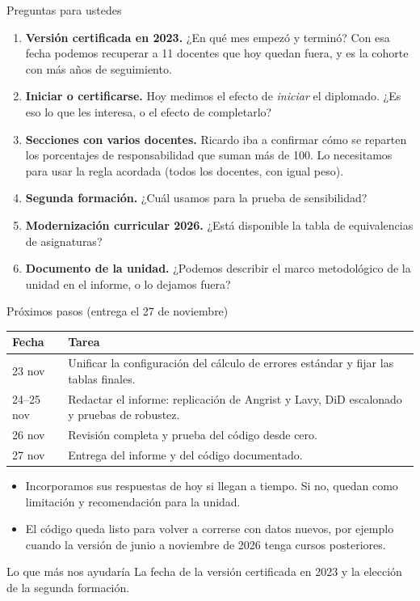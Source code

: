 \documentclass[10pt,aspectratio=169]{beamer}
\begin{document}
\begin{frame}{Preguntas para ustedes}
  \small
  \begin{enumerate}
    \item \textbf{Versión certificada en 2023.} ¿En qué mes empezó y terminó? Con esa fecha podemos recuperar a 11 docentes que hoy quedan fuera, y es la cohorte con más años de seguimiento.
    \item \textbf{Iniciar o certificarse.} Hoy medimos el efecto de \emph{iniciar} el diplomado. ¿Es eso lo que les interesa, o el efecto de completarlo?
    \item \textbf{Secciones con varios docentes.} Ricardo iba a confirmar cómo se reparten los porcentajes de responsabilidad que suman más de 100. Lo necesitamos para usar la regla acordada (todos los docentes, con igual peso).
    \item \textbf{Segunda formación.} ¿Cuál usamos para la prueba de sensibilidad?
    \item \textbf{Modernización curricular 2026.} ¿Está disponible la tabla de equivalencias de asignaturas?
    \item \textbf{Documento de la unidad.} ¿Podemos describir el marco metodológico de la unidad en el informe, o lo dejamos fuera?
  \end{enumerate}
\end{frame}

\begin{frame}{Próximos pasos (entrega el 27 de noviembre)}
  \begin{table}\small
    \begin{tabular}{lp{10.5cm}}
      \toprule
      Fecha & Tarea \\
      \midrule
      23 nov & Unificar la configuración del cálculo de errores estándar y fijar las tablas finales. \\
      24--25 nov & Redactar el informe: replicación de Angrist y Lavy, DiD escalonado y pruebas de robustez. \\
      26 nov & Revisión completa y prueba del código desde cero. \\
      27 nov & Entrega del informe y del código documentado. \\
      \bottomrule
    \end{tabular}
  \end{table}
  \vspace{0.4em}
  \begin{itemize}
    \item Incorporamos sus respuestas de hoy si llegan a tiempo. Si no, quedan como limitación y recomendación para la unidad.
    \item El código queda listo para volver a correrse con datos nuevos, por ejemplo cuando la versión de junio a noviembre de 2026 tenga cursos posteriores.
  \end{itemize}
  \vspace{0.3em}
  \begin{block}{Lo que más nos ayudaría}
    La fecha de la versión certificada en 2023 y la elección de la segunda formación.
  \end{block}
\end{frame}
\end{document}
